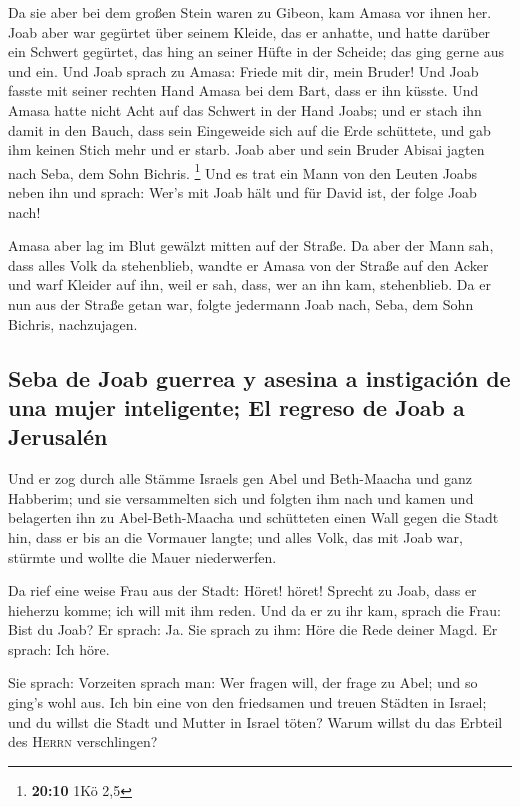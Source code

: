  Da sie aber bei dem großen Stein waren zu Gibeon, kam
Amasa vor ihnen her. Joab aber war gegürtet über seinem Kleide, das er
anhatte, und hatte darüber ein Schwert gegürtet, das hing an seiner
Hüfte in der Scheide; das ging gerne aus und ein.  Und
Joab sprach zu Amasa: Friede mit dir, mein Bruder! Und Joab fasste mit
seiner rechten Hand Amasa bei dem Bart, dass er ihn küsste.
 Und Amasa hatte nicht Acht auf das Schwert in der Hand
Joabs; und er stach ihn damit in den Bauch, dass sein Eingeweide sich
auf die Erde schüttete, und gab ihm keinen Stich mehr und er starb. Joab
aber und sein Bruder Abisai jagten nach Seba, dem Sohn Bichris.
\footnote{\textbf{20:10} 1Kö 2,5}  Und es trat ein Mann
von den Leuten Joabs neben ihn und sprach: Wer's mit Joab hält und für
David ist, der folge Joab nach!

 Amasa aber lag im Blut gewälzt mitten auf der Straße. Da
aber der Mann sah, dass alles Volk da stehenblieb, wandte er Amasa von
der Straße auf den Acker und warf Kleider auf ihn, weil er sah, dass,
wer an ihn kam, stehenblieb.  Da er nun aus der Straße
getan war, folgte jedermann Joab nach, Seba, dem Sohn Bichris,
nachzujagen.

\hypertarget{seba-de-joab-guerrea-y-asesina-a-instigaciuxf3n-de-una-mujer-inteligente-el-regreso-de-joab-a-jerusaluxe9n}{%
\subsection{Seba de Joab guerrea y asesina a instigación de una mujer
inteligente; El regreso de Joab a
Jerusalén}\label{seba-de-joab-guerrea-y-asesina-a-instigaciuxf3n-de-una-mujer-inteligente-el-regreso-de-joab-a-jerusaluxe9n}}

 Und er zog durch alle Stämme Israels gen Abel und
Beth-Maacha und ganz Habberim; und sie versammelten sich und folgten ihm
nach  und kamen und belagerten ihn zu Abel-Beth-Maacha
und schütteten einen Wall gegen die Stadt hin, dass er bis an die
Vormauer langte; und alles Volk, das mit Joab war, stürmte und wollte
die Mauer niederwerfen.

 Da rief eine weise Frau aus der Stadt: Höret! höret!
Sprecht zu Joab, dass er hieherzu komme; ich will mit ihm reden.
 Und da er zu ihr kam, sprach die Frau: Bist du Joab? Er
sprach: Ja. Sie sprach zu ihm: Höre die Rede deiner Magd. Er sprach: Ich
höre.

 Sie sprach: Vorzeiten sprach man: Wer fragen will, der
frage zu Abel; und so ging's wohl aus.  Ich bin eine von
den friedsamen und treuen Städten in Israel; und du willst die Stadt und
Mutter in Israel töten? Warum willst du das Erbteil des \textsc{Herrn}
verschlingen?

